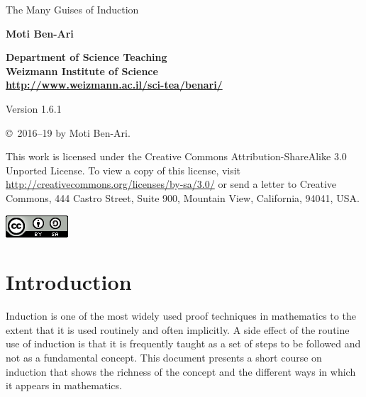 \documentclass[11pt,a4paper]{report}
\begin{document}
\thispagestyle{empty}

\begin{center}
\begin{Huge}
\begin{bfseries}
The Many Guises of Induction
\end{bfseries}
\end{Huge}

\bigskip
\bigskip
\bigskip

\textbf{\LARGE Moti Ben-Ari}

\bigskip

\textbf{\Large Department of Science Teaching\\
Weizmann Institute of Science\\
\bigskip
\url{http://www.weizmann.ac.il/sci-tea/benari/}
}

\bigskip
\bigskip


\begin{Large}
Version 1.6.1
\end{Large}
\end{center}

\vfill

\begin{center}
\copyright{}\  2016--19 by Moti Ben-Ari.
\end{center}

This work is licensed under the Creative Commons Attribution-ShareAlike 3.0 Unported License. To view a copy of this license, visit \url{http://creativecommons.org/licenses/by-sa/3.0/} or send a letter to Creative Commons, 444 Castro Street, Suite 900, Mountain View, California, 94041, USA.

\begin{center}
\includegraphics[width=.2\textwidth]{../../by-sa.png}
\end{center}

\newpage

\setcounter{tocdepth}{0}
\tableofcontents

\chapter{Introduction}\label{s.intro}

Induction is one of the most widely used proof techniques in mathematics to the extent that it is used routinely and often implicitly. A side effect of the routine use of induction is that it is frequently taught as a set of steps to be followed and not as a fundamental concept. This document presents a short course on induction that shows the richness of the concept and the different ways in which it appears in mathematics.
\end{document}
